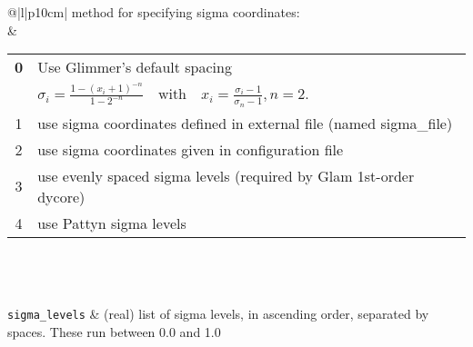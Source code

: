 \begin{center}
\begin{supertabular*}{\textwidth}{@{\extracolsep{\fill}}|l|p{10cm}|}
      method for specifying sigma coordinates:  \\ &
    \begin{tabular}[t]{cl}
      {\bf 0} & Use Glimmer's default spacing \\[0.05in] 
        & $\sigma_i=\frac{1-(x_i+1)^{-n}}{1-2^{-n}}\quad\mbox{with}\quad x_i=\frac{\sigma_i-1}{\sigma_n-1}, n=2.$ \\[0.05in]
      1 & use sigma coordinates defined in external file (named sigma\_file) \\
      2 & use sigma coordinates given in configuration file \\
      3 & use evenly spaced sigma levels (required by Glam 1st-order dycore) \\
      4 & use Pattyn sigma levels \\
    \end{tabular}\\



    \hline
    \hline
    \hline
    \\
    \hline
     \\
    \hline
    \texttt{sigma\_levels} & (real) list of sigma levels, in ascending order, separated by spaces. These run between 0.0 and 1.0 \\




\end{supertabular*}
\end{center}
